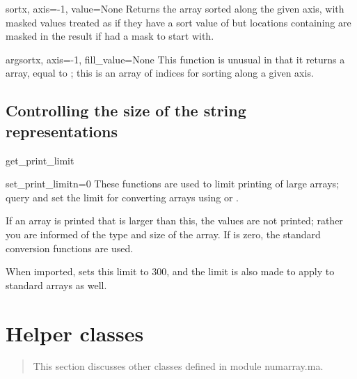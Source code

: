 \begin{funcdesc}{sort}{x, axis=-1, value=None}
   Returns the array  sorted along the given axis, with masked values
   treated as if they have a sort value of  but locations containing
    are masked in the result if  had a mask to start with.
\end{funcdesc}

\begin{funcdesc}{argsort}{x, axis=-1, fill_value=None}
   This function is unusual in that it returns a \module{\numarray} array,
   equal to ; this is an
   array of indices for sorting along a given axis.
\end{funcdesc}



\subsection{Controlling the size of the string representations}
\label{sec:numarray.ma:contr-size-string}


\begin{funcdesc}{get_print_limit}{}
\end{funcdesc}
\begin{funcdesc}{set_print_limit}{n=0}
   These functions are used to limit printing of large arrays; query and set
   the limit for converting arrays using  or .
   
   If an array is printed that is larger than this, the values are not printed;
   rather you are informed of the type and size of the array. If  is
   zero, the standard \module{\numarray} conversion functions are used.
   
   When imported,  sets this limit to 300, and the limit is also
   made to apply to standard \module{\numarray} arrays as well.
\end{funcdesc}



\section{Helper classes}
\label{sec:numarray.ma:helper-classes}

\begin{quote}
   This section discusses other classes defined in module numarray.ma.
\end{quote}


